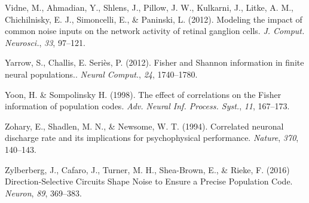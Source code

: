 \documentclass[12pt]{article}
\begin{document}
\begin{thebibliography}{100}
Vidne, M., Ahmadian, Y., Shlens, J., Pillow, J. W., Kulkarni, J., Litke, A. M., Chichilnisky, E. J., Simoncelli, E., \& Paninski, L. (2012).
\newblock Modeling the impact of common noise inputs on the network activity of retinal ganglion cells.
\newblock \emph{J. Comput. Neurosci.}, \emph{33}, 97--121.

Yarrow, S., Challis, E. Seri\`{e}s, P. (2012).
\newblock Fisher and Shannon information in finite neural populations..
\newblock \emph{Neural Comput.}, \emph{24}, 1740--1780.

Yoon, H. \& Sompolinsky H. (1998).
\newblock The effect of correlations on the Fisher information of population codes. 
\newblock \emph{Adv. Neural Inf. Process. Syst.}, \emph{11}, 167--173. 

Zohary, E., Shadlen, M. N., \& Newsome, W. T. (1994).
\newblock Correlated neuronal discharge rate and its implications for psychophysical performance.
\newblock \emph{Nature}, \emph{370}, 140--143.

Zylberberg, J., Cafaro, J., Turner, M. H., Shea-Brown, E., \& Rieke, F. (2016)
\newblock Direction-Selective Circuits Shape Noise to Ensure a Precise Population Code.
\newblock \emph{Neuron}, \emph{89}, 369--383.


\end{thebibliography}
\end{document}
